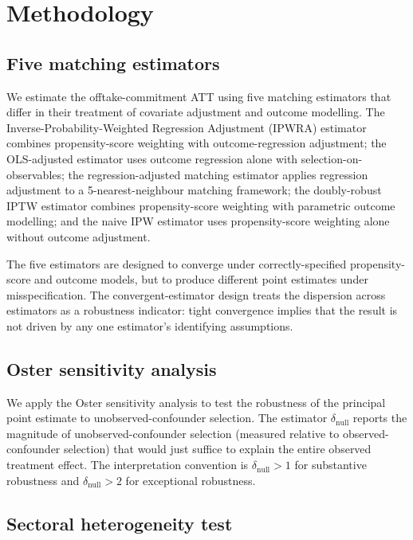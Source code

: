 \documentclass[12pt,a4paper]{article}
\theoremstyle{plain}
\theoremstyle{definition}
\begin{document}
\section{Methodology}
\label{sec:methodology}

\subsection{Five matching estimators}
\label{sec:method-estimators}

We estimate the offtake-commitment ATT using five matching estimators that differ in their treatment of covariate adjustment and outcome modelling. The Inverse-Probability-Weighted Regression Adjustment (IPWRA) estimator combines propensity-score weighting with outcome-regression adjustment; the OLS-adjusted estimator uses outcome regression alone with selection-on-observables; the regression-adjusted matching estimator applies regression adjustment to a 5-nearest-neighbour matching framework; the doubly-robust IPTW estimator combines propensity-score weighting with parametric outcome modelling; and the naive IPW estimator uses propensity-score weighting alone without outcome adjustment.

The five estimators are designed to converge under correctly-specified propensity-score and outcome models, but to produce different point estimates under misspecification. The convergent-estimator design treats the dispersion across estimators as a robustness indicator: tight convergence implies that the result is not driven by any one estimator's identifying assumptions.

\subsection{Oster sensitivity analysis}
\label{sec:method-oster}

We apply the Oster sensitivity analysis \cite{oster2019unobservable} to test the robustness of the principal point estimate to unobserved-confounder selection. The estimator $\delta_{\text{null}}$ reports the magnitude of unobserved-confounder selection (measured relative to observed-confounder selection) that would just suffice to explain the entire observed treatment effect. The interpretation convention is $\delta_{\text{null}} > 1$ for substantive robustness and $\delta_{\text{null}} > 2$ for exceptional robustness.

\subsection{Sectoral heterogeneity test}
\label{sec:method-heterogeneity}
\end{document}
